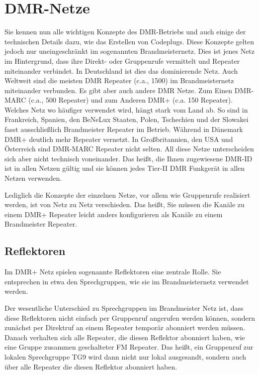 \section{DMR-Netze} \label{sec:netze}
Sie kennen nun alle wichtigen Konzepte des DMR-Betriebs und auch einige der technischen Details dazu, wie das Erstellen von Codeplugs. Diese Konzepte gelten jedoch nur uneingeschränkt im sogenannten Brandmeisternetz. Dies ist jenes Netz im Hintergrund, dass ihre Direkt- oder Gruppenrufe vermittelt und Repeater miteinander verbindet. In Deutschland ist dies das dominierende Netz. Auch Weltweit sind die meisten DMR Repeater (c.a., 1500) im Brandmeisternetz miteinander verbunden. Es gibt aber auch andere DMR Netze. Zum Einen DMR-MARC (c.a., 500 Repeater) und zum Anderen DMR+ (c.a. 150 Repeater). Welches Netz wo häufiger verwendet wird, hängt stark vom Land ab. So sind in Frankreich, Spanien, den BeNeLux Staaten, Polen, Tschechien und der Slowakei fasst ausschließlich Brandmeister Repeater im Betrieb. Während in Dänemark DMR+ deutlich mehr Repeater vernetzt. In Großbritannien, den USA und Österreich sind DMR-MARC Repeater nicht selten. All diese Netze unterscheiden sich aber nicht technisch voneinander. Das heißt, die Ihnen zugewiesene DMR-ID ist in allen Netzen gültig und sie können jedes Tier-II DMR Funkgerät in allen Netzen verwenden. 

Lediglich die Konzepte der einzelnen Netze, vor allem wie Gruppenrufe realisiert werden, ist von Netz zu Netz verschieden. Das heißt, Sie müssen die Kanäle zu einem DMR+ Repeater leicht anders konfigurieren als Kanäle zu einem Brandmeister Repeater. 

\subsection{Reflektoren} \label{sec:reflector} 
Im DMR+ Netz spielen sogenannte Reflektoren eine zentrale Rolle. Sie entsprechen in etwa den Sprechgruppen, wie sie im Brandmeisternetz verwendet werden. 

Der wesentliche Unterschied zu Sprechgruppen im Brandmeister Netz ist, dass diese Reflektoren nicht einfach per Gruppenruf angerufen werden können, sondern zunächst per Direktruf an einem Repeater temporär abonniert werden müssen. Danach verhalten sich alle Repeater, die diesen Reflektor abonniert haben, wie eine Gruppe zusammen geschalteter FM Repeater. Das heißt, ein Gruppenruf zur lokalen Sprechgruppe TG9 wird dann nicht nur lokal ausgesandt, sondern auch über alle Repeater die diesen Reflektor abonniert haben.


